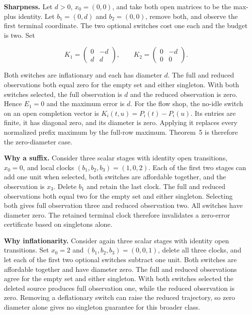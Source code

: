 \documentclass[11pt,letterpaper]{article}
\begin{document}
\noindent\textbf{Sharpness.} Let $d>0$, $x_0=(0,0)$, and take both open matrices to be the max-plus identity. Let $b_1=(0,d)$ and $b_2=(0,0)$, remove both, and observe the first terminal coordinate. The two optional switches cost one each and the budget is two. Set

\[
K_1=\begin{pmatrix}0&-d\\ d&d\end{pmatrix},\qquad K_2=\begin{pmatrix}0&-d\\0&0\end{pmatrix}.
\]

Both switches are inflationary and each has diameter $d$. The full and reduced observations both equal zero for the empty set and either singleton. With both switches selected, the full observation is $d$ and the reduced observation is zero. Hence $E_1=0$ and the maximum error is $d$. For the flow shop, the no-idle switch on an open completion vector is $K_i(t,u)=P_i(t)-P_i(u)$. Its entries are finite, it has diagonal zero, and its diameter is zero. Applying it replaces every normalized prefix maximum by the full-row maximum. Theorem~5 is therefore the zero-diameter case.

\noindent\textbf{Why a suffix.} Consider three scalar stages with identity open transitions, $x_0=0$, and local clocks $(b_1,b_2,b_3)=(1,0,2)$. Each of the first two stages can add one unit when selected, both switches are affordable together, and the observation is $x_3$. Delete $b_1$ and retain the last clock. The full and reduced observations both equal two for the empty set and either singleton. Selecting both gives full observation three and reduced observation two. All switches have diameter zero. The retained terminal clock therefore invalidates a zero-error certificate based on singletons alone.

\noindent\textbf{Why inflationarity.} Consider again three scalar stages with identity open transitions. Set $x_0=2$ and $(b_1,b_2,b_3)=(0,0,1)$, delete all three clocks, and let each of the first two optional switches subtract one unit. Both switches are affordable together and have diameter zero. The full and reduced observations agree for the empty set and either singleton. With both switches selected the deleted source produces full observation one, while the reduced observation is zero. Removing a deflationary switch can raise the reduced trajectory, so zero diameter alone gives no singleton guarantee for this broader class.
\end{document}
